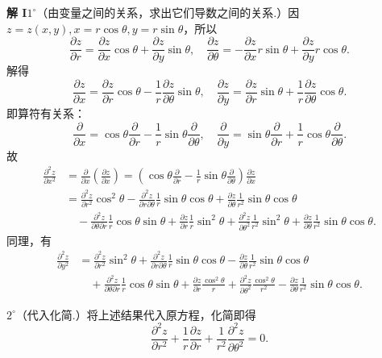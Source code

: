 \documentclass[UTF8, 12pt, fontset=fandol, oneside]{ctexart}
\begin{document}
\noindent\textbf{解 I}\quad $1^\circ$（由变量之间的关系，求出它们导数之间的关系.）因 $z=z(x,y),x=r\cos\theta,y=r\sin\theta$，所以
\[
  \frac{\partial z}{\partial r}=\frac{\partial z}{\partial x}\cos\theta+\frac{\partial z}{\partial y}\sin\theta,\quad
  \frac{\partial z}{\partial\theta}=-\frac{\partial z}{\partial x}r\sin\theta+\frac{\partial z}{\partial y}r\cos\theta. \tag{1}
\]
解得
\[
  \frac{\partial z}{\partial x}=\frac{\partial z}{\partial r}\cos\theta-\frac1r\frac{\partial z}{\partial\theta}\sin\theta,\quad
  \frac{\partial z}{\partial y}=\frac{\partial z}{\partial r}\sin\theta+\frac1r\frac{\partial z}{\partial\theta}\cos\theta. \tag{2}
\]
即算符有关系：
\[
  \frac{\partial}{\partial x}=\cos\theta\frac{\partial}{\partial r}-\frac1r\sin\theta\frac{\partial}{\partial\theta},\quad
  \frac{\partial}{\partial y}=\sin\theta\frac{\partial}{\partial r}+\frac1r\cos\theta\frac{\partial}{\partial\theta}. \tag{3}
\]
故
\[
\begin{aligned}
\frac{\partial^2 z}{\partial x^2}
&=\frac{\partial}{\partial x}\left(\frac{\partial z}{\partial x}\right)
=\left(\cos\theta\frac{\partial}{\partial r}-\frac1r\sin\theta\frac{\partial}{\partial\theta}\right)\frac{\partial z}{\partial x}\\
&=\frac{\partial^2z}{\partial r^2}\cos^2\theta
-\frac{\partial^2z}{\partial r\partial\theta}\frac1r\sin\theta\cos\theta
+\frac{\partial z}{\partial\theta}\frac1{r^2}\sin\theta\cos\theta\\
&\quad-\frac{\partial^2z}{\partial\theta\partial r}\frac1r\cos\theta\sin\theta
+\frac{\partial z}{\partial r}\frac1r\sin^2\theta
+\frac{\partial^2z}{\partial\theta^2}\frac1{r^2}\sin^2\theta
+\frac{\partial z}{\partial\theta}\frac1{r^2}\sin\theta\cos\theta.
\end{aligned}
\]
同理，有
\[
\begin{aligned}
\frac{\partial^2z}{\partial y^2}
&=\frac{\partial^2z}{\partial r^2}\sin^2\theta
+\frac{\partial^2z}{\partial r\partial\theta}\frac1r\sin\theta\cos\theta
-\frac{\partial z}{\partial\theta}\frac1{r^2}\sin\theta\cos\theta\\
&\quad+\frac{\partial^2z}{\partial\theta\partial r}\frac1r\cos\theta\sin\theta
+\frac{\partial z}{\partial r}\frac{\cos^2\theta}{r}
+\frac{\partial^2z}{\partial\theta^2}\frac{\cos^2\theta}{r^2}
-\frac{\partial z}{\partial\theta}\frac1{r^2}\sin\theta\cos\theta.
\end{aligned}
\]

$2^\circ$（代入化简.）将上述结果代入原方程，化简即得
\[
  \frac{\partial^2z}{\partial r^2}+\frac1r\frac{\partial z}{\partial r}
  +\frac1{r^2}\frac{\partial^2z}{\partial\theta^2}=0. \tag{4}
\]
\end{document}
